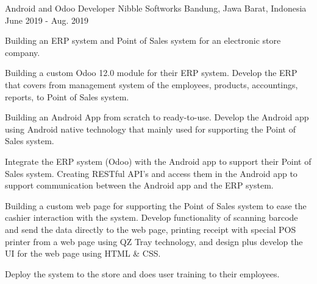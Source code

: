 

\begin{cventries}

  \cventry
    {Android and Odoo Developer} %
    {Nibble Softworks} %
    {Bandung, Jawa Barat, Indonesia} %
    {June 2019 - Aug. 2019} %
    {
      \begin{cvitems} %
        \item {Building an ERP system and Point of Sales system for an electronic store company.}
        \item {Building a custom Odoo 12.0 module for their ERP system. Develop the ERP that covers from management system of the employees, products, accountings, reports, to Point of Sales system.}
        \item {Building an Android App from scratch to ready-to-use. Develop the Android app using Android native technology that mainly used for supporting the Point of Sales system.}
        \item {Integrate the ERP system (Odoo) with the Android app to support their Point of Sales system. Creating RESTful API's and access them in the Android app to support communication between the Android app and the ERP system.}
        \item {Building a custom web page for supporting the Point of Sales system to ease the cashier interaction with the system. Develop functionality of scanning barcode and send the data directly to the web page, printing receipt with special POS printer from a web page using QZ Tray technology, and design plus develop the UI for the web page using HTML \& CSS.}
        \item {Deploy the system to the store and does user training to their employees.}
      \end{cvitems}
    }


\end{cventries}
